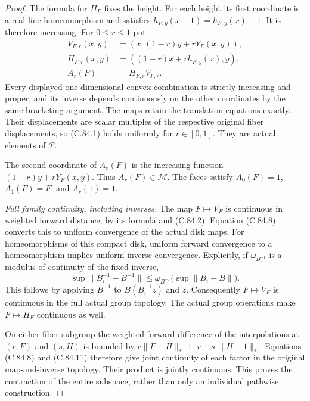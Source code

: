 \begin{proof}
The formula for $H_F$ fixes the height.
For each height its first coordinate
is a real-line homeomorphism and satisfies
$h_{F,y}(x+1)=h_{F,y}(x)+1$.
It is therefore increasing.
For $0\leq r\leq1$ put
\[
 \begin{split}
 V_{F,r}(x,y)
    &=(x,(1-r)y+rY_F(x,y)),\\
 H_{F,r}(x,y)
    &=((1-r)x+rh_{F,y}(x),y),\\
 A_r(F)&=H_{F,r}V_{F,r}.
 \end{split}                                                    \tag{C.84.10}
\]
Every displayed one-dimensional
convex combination is strictly
increasing and proper, and its
inverse depends continuously on
the other coordinates by the
same bracketing argument.
The maps retain the translation
equations exactly. Their
displacements are scalar multiples
of the respective original fiber
displacements, so (C.84.1) holds
uniformly for $r\in[0,1]$.
They are actual elements of
$\mathscr P$.

The second coordinate of $A_r(F)$
is the increasing function
$(1-r)y+rY_F(x,y)$.
Thus $A_r(F)\in\mathscr M$.
The faces satisfy
$A_0(F)=1$, $A_1(F)=F$, and
$A_r(1)=1$.

\emph{Full family continuity, including inverses.}
The map $F\mapsto V_F$ is continuous
in weighted forward distance, by
its formula and (C.84.2).
Equation (C.84.8) converts this
to uniform convergence of the
actual disk maps.
For homeomorphisms of this compact
disk, uniform forward convergence
to a homeomorphism implies uniform
inverse convergence. Explicitly,
if $\omega_{B^{-1}}$ is a modulus
of continuity of the fixed inverse,
\[
 \sup\|B_i^{-1}-B^{-1}\|
     \leq\omega_{B^{-1}}
                     \bigl(\sup\|B_i-B\|\bigr).
                                                               \tag{C.84.11}
\]
This follows by applying $B^{-1}$
to $B(B_i^{-1}z)$ and $z$.
Consequently $F\mapsto V_F$ is
continuous in the full actual
group topology. The actual group
operations make $F\mapsto H_F$
continuous as well.

On either fiber subgroup the
weighted forward difference of
the interpolations at $(r,F)$
and $(s,H)$ is bounded by
$r\|F-H\|_*+|r-s|\|H-1\|_*$.
Equations (C.84.8) and (C.84.11)
therefore give joint continuity
of each factor in the original
map-and-inverse topology.
Their product is jointly
continuous. This proves the
contraction of the entire
subspace, rather than only an
individual pathwise construction.


\end{proof}
